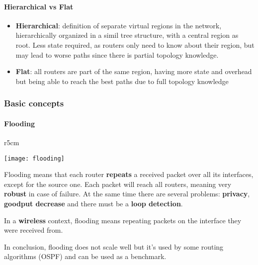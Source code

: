 \paragraph{Hierarchical vs Flat}
\begin{itemize}
	\item \textbf{Hierarchical}: definition of separate virtual regions in the network, hierarchically organized in a simil tree structure, with a central region as root. Less state required, as routers only need to know about their region, but may lead to worse paths since there is partial topology knowledge.
	\item \textbf{Flat}: all routers are part of the same region, having more state and overhead but being able to reach the best paths due to full topology knowledge
\end{itemize}

\subsubsection{Basic concepts}
\paragraph{Flooding}
\begin{wrapfigure}[7]{r}{5cm}
	\vspace{-2cm}
	\begin{center}
		\texttt{[image: flooding]}
	\end{center}
\end{wrapfigure}
Flooding means that each router \textbf{repeats} a received packet over all its interfaces, except for the source one. Each packet will reach all routers, meaning very \textbf{robust} in case of failure. At the same time there are several problems: \textbf{privacy}, \textbf{goodput decrease} and there must be a \textbf{loop detection}.

\begin{note}
	In a \textbf{wireless} context, flooding means repeating packets on the interface they were received from.
\end{note}

In conclusion, flooding does not scale well but it's used by some routing algorithms (OSPF) and can be used as a benchmark.

